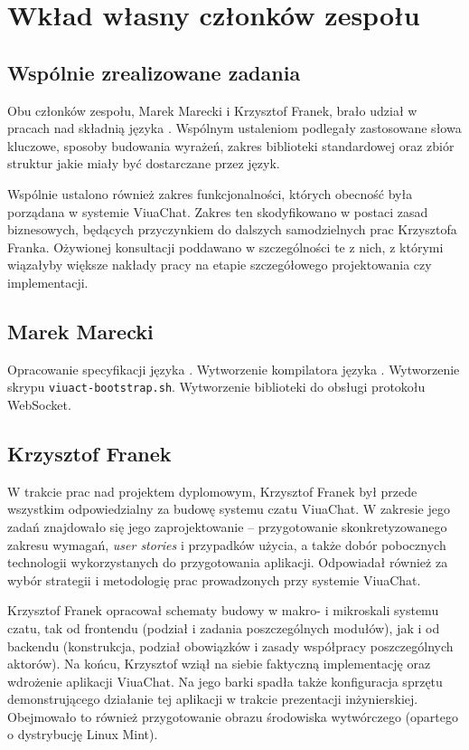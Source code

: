 \chapter{Wkład własny członków zespołu}
\label{wklad_wlasny}

\section{Wspólnie zrealizowane zadania}

Obu członków zespołu, Marek Marecki i Krzysztof Franek, brało udział w pracach
nad składnią języka \ViuAct. Wspólnym ustaleniom podlegały zastosowane słowa
kluczowe, sposoby budowania wyrażeń, zakres biblioteki standardowej oraz
zbiór struktur jakie miały być dostarczane przez język.

Wspólnie ustalono również zakres funkcjonalności, których obecność była porządana
w systemie ViuaChat. Zakres ten skodyfikowano w postaci zasad biznesowych, będących
przyczynkiem do dalszych samodzielnych prac Krzysztofa Franka. Ożywionej
konsultacji poddawano w szczególności te z nich, z którymi wiązałyby
większe nakłady pracy na etapie szczegółowego projektowania czy implementacji.

\section{Marek Marecki}

Opracowanie specyfikacji języka \ViuAct.
Wytworzenie kompilatora języka \ViuAct.
Wytworzenie skrypu \texttt{viuact-bootstrap.sh}.
Wytworzenie biblioteki do obsługi protokołu WebSocket.

\section{Krzysztof Franek}

W trakcie prac nad projektem dyplomowym, Krzysztof Franek był przede wszystkim
odpowiedzialny za budowę systemu czatu ViuaChat. W zakresie jego zadań znajdowało
się jego zaprojektowanie -- przygotowanie skonkretyzowanego zakresu wymagań,
\textit{user stories} i przypadków użycia, a także dobór pobocznych technologii
wykorzystanych do przygotowania aplikacji. Odpowiadał również za wybór strategii
i metodologię prac prowadzonych przy systemie ViuaChat.

Krzysztof Franek opracował schematy budowy w makro- i mikroskali
systemu czatu, tak od frontendu (podział
i zadania poszczególnych modułów), jak i od backendu (konstrukcja, podział obowiązków
i zasady współpracy poszczególnych aktorów). Na końcu, Krzysztof wziął na siebie
faktyczną implementację oraz wdrożenie aplikacji ViuaChat. Na jego barki spadła
także konfiguracja sprzętu demonstrującego działanie tej aplikacji w trakcie
prezentacji inżynierskiej. Obejmowało to również przygotowanie obrazu środowiska
wytwórczego (opartego o dystrybucję Linux Mint).

